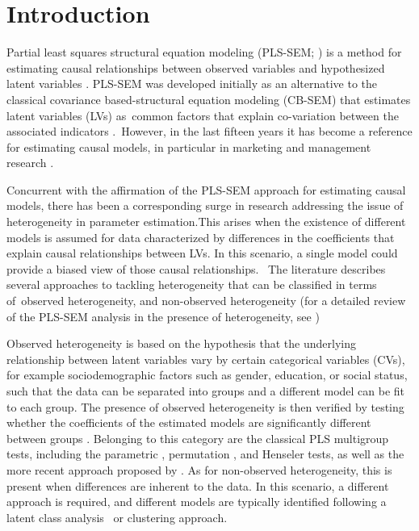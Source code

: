 \section{Introduction}

Partial least squares structural equation modeling (PLS-SEM; \citealp{Wold85}) is a method for estimating causal relationships between observed variables and hypothesized latent variables \citep{Evermann21}. PLS-SEM was developed initially as an alternative to the classical covariance based-structural equation modeling (CB-SEM) that estimates latent variables (LVs) as common factors that explain co-variation between the associated indicators \citep{Hair17b}. However, in the last fifteen years it has become a reference for estimating causal models, in particular in marketing and management research \citep{Beker22, Sarstedt22a, Sarstedt22b, Hair21, henseler21, Evermann21}.

Concurrent with the affirmation of the PLS-SEM approach for estimating causal models, there has been a corresponding surge in research addressing the issue of heterogeneity in parameter estimation.This arises when the existence of different models is assumed for data characterized by differences in the coefficients that explain causal relationships between LVs. In this scenario, a single model could provide a biased view of those causal relationships.  The literature describes several approaches to tackling heterogeneity that can be classified in terms of observed heterogeneity, and non-observed heterogeneity (for a detailed review of the PLS-SEM analysis in the presence of heterogeneity, see \citealp{Klesel22})

Observed heterogeneity is based on the hypothesis that the underlying relationship between latent variables vary by certain categorical variables (CVs), for example sociodemographic factors such as gender, education, or social status, such that the data can be separated into groups and a different model can be fit to each group. The presence of observed heterogeneity is then verified by testing whether the coefficients of the estimated models are significantly different between groups \citep{Hair17}. Belonging to this category are the classical PLS multigroup tests, including the parametric \citep{Keil00}, permutation \citep{Chin10}, and Henseler \citep{Henseler09} tests, as well as the more recent approach proposed by \citet{Klesel19}. As for non-observed heterogeneity, this is present when differences are inherent to the data. In this scenario, a different approach is required, and different models are typically identified following a latent class analysis \citep{Sarstedt22c} or clustering \citep{Vinzi08} approach.

